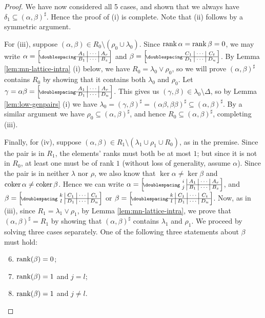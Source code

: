 \begin{lemma}
\begin{proof}
    We have now considered all 5 cases, and shown that we always have
    $\delta_1 \subseteq (\alpha, \beta)^\sharp$.  Hence the proof of
    (i) is complete.  Note that (ii) follows by a symmetric argument.

    For (iii), suppose $(\alpha,\beta)\in R_0\setminus(\rho_0\cup\lambda_0)$.
    Since $\operatorname{rank}\alpha = \operatorname{rank}\beta = 0$, we may write
    $\alpha=\bipart{c|c|c}{1-3}{A_1 & \cdots & A_r}{B_1 & \cdots & B_s}$ and
    $\beta=\bipart{c|c|c}{1-3}{C_1 & \cdots & C_t}{D_1 & \cdots & D_u}$.
    By Lemma \ref{lem:mn-lattice-intra} (i) below, we have
    $R_0 = \lambda_0\vee\rho_0$, so we will prove $(\alpha,\beta)^\sharp$
    contains $R_0$ by showing that it contains both $\lambda_0$ and $\rho_0$.
    Let $\gamma = \alpha\beta =
    \bipart{c|c|c}{1-3}{A_1 & \cdots & A_r}{D_1 & \cdots & D_u}$.
    This gives us
    $(\gamma,\beta) \in \lambda_0\setminus\Delta$,
    so by Lemma \ref{lem:low-genpairs} (i) we have
    $\lambda_0 = (\gamma,\beta)^\sharp
    = (\alpha\beta, \beta\beta)^\sharp
    \subseteq (\alpha, \beta)^\sharp$.  By a similar argument we have
    $\rho_0 \subseteq (\alpha,\beta)^\sharp$, and hence
    $R_0 \subseteq (\alpha,\beta)^\sharp$, completing (iii).

    Finally, for (iv), suppose
    $(\alpha,\beta) \in R_1 \setminus (\lambda_1 \cup \rho_1 \cup R_0)$, as in
    the premise.  Since the pair is in $R_1$, the elements' ranks must both be
    at most $1$; but since it is not in $R_0$, at least one must be of rank $1$
    (without loss of generality, assume $\alpha$).  Since the pair is in neither
    $\lambda$ nor $\rho$, we also know that $\ker\alpha \neq \ker\beta$ and
    $\operatorname{coker}\alpha \neq \operatorname{coker}\beta$.
    Hence we can write
    $\alpha = \bipart{c|c|c|c}{2-4}
    {i & A_1 & \cdots & A_r}{j & B_1 & \cdots & B_s}$, and
    $\beta = \bipart{c|c|c|c}{2-4}
    {k & C_1 & \cdots & C_t}{l & D_1 & \cdots & D_u}$ or
    $\beta = \bipart{c|c|c|c}{1-4}
    {k & C_1 & \cdots & C_t}{l & D_1 & \cdots & D_u}$.  Now, as in (iii),
    since $R_1 = \lambda_1 \vee \rho_1$, by Lemma \ref{lem:mn-lattice-intra}, we
    prove that $(\alpha,\beta)^\sharp = R_1$ by showing that
    $(\alpha,\beta)^\sharp$ contains $\lambda_1$ and $\rho_1$.  We proceed by
    solving three cases separately.  One of the following three statements about
    $\beta$ must hold:
    \begin{enumerate}[\rm(a)]
      \setcounter{enumi}{5}
    \item $\operatorname{rank}(\beta) = 0$;
    \item $\operatorname{rank}(\beta) = 1$ and $j = l$;
    \item $\operatorname{rank}(\beta) = 1$ and $j \neq l$.
    \end{enumerate}


\end{proof}
\end{lemma}
